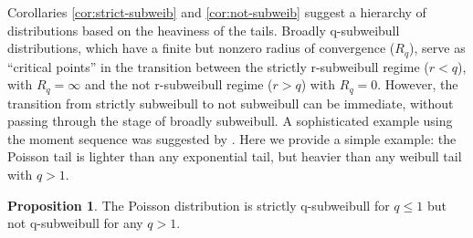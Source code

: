 \documentclass{article}
\theoremstyle{definition}
\newtheorem{proposition}{Proposition}[section]
\begin{document}
Corollaries \ref{cor:strict-subweib} and \ref{cor:not-subweib} suggest a hierarchy of distributions based on the heaviness of the tails. Broadly q-subweibull distributions, which have a finite but nonzero radius of convergence ($R_q$), serve as ``critical points'' in the transition between the strictly r-subweibull regime ($r<q$), with $R_q=\infty$ and the not r-subweibull regime ($r>q$) with $R_q=0$. However, the transition from strictly subweibull to not subweibull can be immediate, without passing through the stage of broadly subweibull. A sophisticated example using the moment sequence was suggested by \cite{4907906}. Here we provide a simple example: the Poisson tail is lighter than any exponential tail, but heavier than any weibull tail with $q>1$. 
\begin{proposition}
\label{prop:poi-subweib}
The Poisson distribution is strictly q-subweibull for $q\leq 1$ but not q-subweibull for any $q>1$.
\end{proposition}
\end{document}
